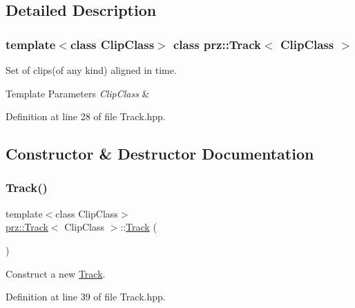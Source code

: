 \subsection{Detailed Description}
\subsubsection*{template$<$class Clip\+Class$>$\newline
class prz\+::\+Track$<$ Clip\+Class $>$}

Set of clips(of any kind) aligned in time. 


\begin{DoxyTemplParams}{Template Parameters}
{\em Clip\+Class} & \\
\hline
\end{DoxyTemplParams}


Definition at line 28 of file Track.\+hpp.



\subsection{Constructor \& Destructor Documentation}
\mbox{\label{classprz_1_1_track_a65d3d9efb5a6640f94c5f22cacadd625}} 
\subsubsection{\texorpdfstring{Track()}{Track()}}
{\footnotesize\ttfamily template$<$class Clip\+Class$>$ \\
\mbox{\hyperlink{classprz_1_1_track}{prz\+::\+Track}}$<$ Clip\+Class $>$\+::\mbox{\hyperlink{classprz_1_1_track}{Track}} (\begin{DoxyParamCaption}{ }\end{DoxyParamCaption})\hspace{0.3cm}{\ttfamily [inline]}}



Construct a new \mbox{\hyperlink{classprz_1_1_track}{Track}}. 



Definition at line 39 of file Track.\+hpp.

\mbox{\label{classprz_1_1_track_a84507a3e2e1cbb97d21298e73b7a24e3}} 

